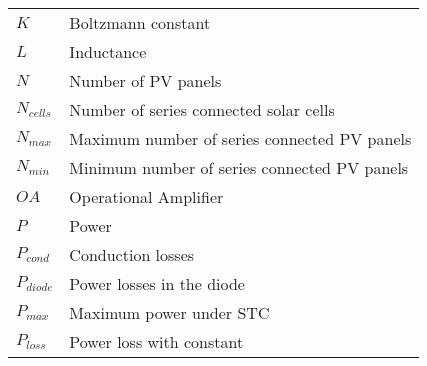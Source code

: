 \begin{tabular}{ll}
$K$ & Boltzmann constant \\
$L$ & Inductance\\
$N$ & Number of PV panels \\
$N_{cells}$ & Number of series connected solar cells \\ 
$N_{max}$ & Maximum number of series connected PV panels \\
$N_{min}$ & Minimum number of series connected PV panels \\
$OA$ & Operational Amplifier \\
$P$ & Power\\
$P_{cond}$ & Conduction losses \\
$P_{diode}$ & Power losses in the diode \\
$P_{max}$ & Maximum power under STC\\
$P_{loss}$ & Power loss with constant \\
\end{tabular}
\newpage

